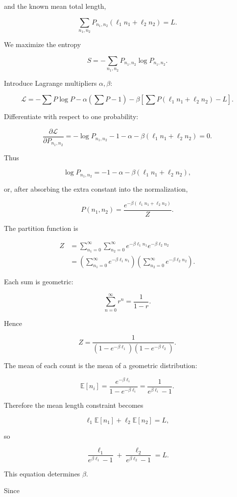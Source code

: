 \documentclass[11pt]{article}
\newcommand{\E}{\mathbb{E}}
\begin{document}
and the known mean total length,

\[
\sum_{n_1,n_2}
P_{n_1,n_2}
(\ell_1n_1+\ell_2n_2)
=
L.
\]

We maximize the entropy

\[
S
=
-\sum_{n_1,n_2}
P_{n_1,n_2}\log P_{n_1,n_2}.
\]

Introduce Lagrange multipliers \(\alpha,\beta\):

\[
\mathcal L
=
-\sum P\log P
-\alpha\left(\sum P-1\right)
-\beta
\left[
\sum P(\ell_1n_1+\ell_2n_2)-L
\right].
\]

Differentiate with respect to one probability:

\[
\frac{\partial\mathcal L}{\partial P_{n_1,n_2}}
=
-\log P_{n_1,n_2}
-1
-\alpha
-\beta(\ell_1n_1+\ell_2n_2)
=0.
\]

Thus

\[
\log P_{n_1,n_2}
=
-1-\alpha
-\beta(\ell_1n_1+\ell_2n_2),
\]

or, after absorbing the extra constant into the normalization,

\[
P(n_1,n_2)
=
\frac{
e^{-\beta(\ell_1n_1+\ell_2n_2)}
}{Z}.
\]

The partition function is

\begin{align*}
Z
&=
\sum_{n_1=0}^{\infty}
\sum_{n_2=0}^{\infty}
e^{-\beta\ell_1n_1}
e^{-\beta\ell_2n_2} \\
&=
\left(
\sum_{n_1=0}^{\infty}e^{-\beta\ell_1n_1}
\right)
\left(
\sum_{n_2=0}^{\infty}e^{-\beta\ell_2n_2}
\right).
\end{align*}

Each sum is geometric:

\[
\sum_{n=0}^{\infty}r^n=\frac{1}{1-r}.
\]

Hence

\[
Z
=
\frac{1}{
(1-e^{-\beta\ell_1})
(1-e^{-\beta\ell_2})
}.
\]

The mean of each count is the mean of a geometric distribution:

\[
\E[n_i]
=
\frac{e^{-\beta\ell_i}}
{1-e^{-\beta\ell_i}}
=
\frac{1}{e^{\beta\ell_i}-1}.
\]

Therefore the mean length constraint becomes

\[
\ell_1\E[n_1]+\ell_2\E[n_2]=L,
\]

so

\[
\frac{\ell_1}{e^{\beta\ell_1}-1}
+
\frac{\ell_2}{e^{\beta\ell_2}-1}
=
L.
\]

This equation determines \(\beta\).

Since
\end{document}
